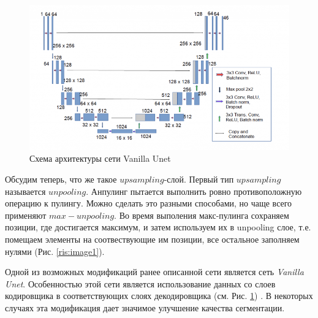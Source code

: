 \documentclass{article}
\theoremstyle{definition}
\theoremstyle{theorem}
\theoremstyle{remark}
\theoremstyle{theorem}
\theoremstyle{example}
\theoremstyle{theorem}
\theoremstyle{theorem}
\theoremstyle{theorem}
\theoremstyle{theorem}
\begin{document}
\begin{figure}[h!]
\begin{center}
	\includegraphics[width=1\textwidth]{img/vanila.png}
\end{center}
\caption{Схема архитектуры сети Vanilla Unet}
\label{ris:image2}
\end{figure}

Обсудим теперь, что же такое $upsampling$-слой. Первый тип $upsampling$ называется $unpooling$.	 Анпулинг пытается выполнить ровно противоположную операцию к пулингу. Можно сделать это разными способами, но чаще всего применяют $max-unpooling$.
Во время выполения макс-пулинга сохраняем позиции, где достигается максимум, и затем используем их в unpooling слое, т.е. помещаем элементы на соотвествующие им позиции, все остальное заполняем нулями (Рис. \ref{ris:image1}).


Одной из возможных модификаций ранее описанной сети является сеть \textit{Vanilla Unet}. 
Особенностью этой сети является использование данных со слоев кодировщика в соответствующих слоях декодировщика (см. Рис. \ref{ris:image2})	. В некоторых случаях эта модификация дает значимое улучшение качества сегментации.
\end{document}
